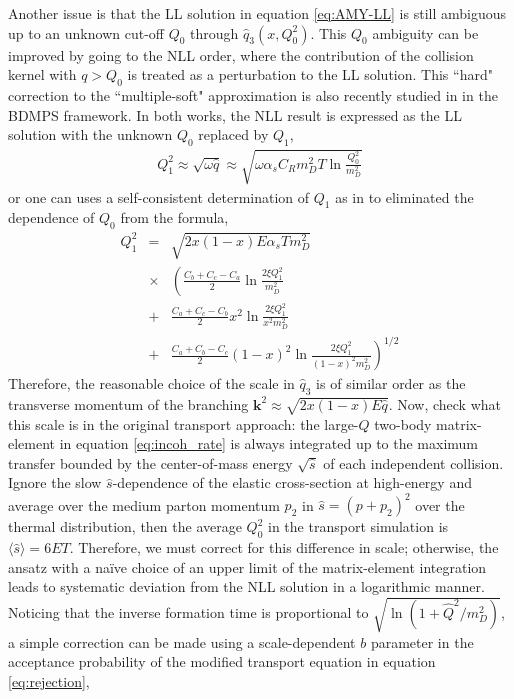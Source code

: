 \documentclass[aps, prc, reprint, amsmath, groupedaddress, nofootinbib]{revtex4-1}
\begin{document}
Another issue is that the LL solution in equation \ref{eq:AMY-LL} is still ambiguous up to an unknown cut-off $Q_0$ through $\hat{q}_3(x, Q_0^2)$.
This $Q_0$ ambiguity can be improved by going to the NLL order, where the contribution of the collision kernel with $q>Q_0$ is treated as a perturbation to the LL solution.
This ``hard" correction to the ``multiple-soft" approximation is also recently studied in \cite{Mehtar-Tani:2019tvy} in the BDMPS framework.
In both works, the NLL result is expressed as the LL solution with the unknown $Q_0$ replaced by $Q_1$,
\begin{eqnarray}
Q_1^2  \approx \sqrt{\omega \hat{q}} \approx \sqrt{\omega \alpha_s C_R m_D^2 T \ln\frac{Q_0^2}{m_D^2}}
\label{eq:Q1}
\end{eqnarray}
or one can uses a self-consistent determination of $Q_1$ as in \cite{Arnold:2008zu} to eliminated the dependence of $Q_0$ from the formula,
\begin{eqnarray}
Q_1^2 &=& \sqrt{2 x (1-x) E \alpha_s T m_D^2}\\\nonumber
&\times & \left(
\frac{C_b+C_c-C_a}{2}\ln\frac{2\xi Q_1^2}{m_D^2} \right.\\\nonumber 
&+& \frac{C_a+C_c-C_b}{2} x^2 \ln\frac{2\xi Q_1^2}{x^2 m_D^2} \\\nonumber 
&+& \left.\frac{C_a+C_b-C_c}{2} (1-x)^2 \ln\frac{2\xi Q_1^2}{(1-x)^2 m_D^2} \right)^{1/2}
\label{eq:Q1-sf}
\end{eqnarray}
Therefore, the reasonable choice of the scale in $\hat{q}_3$ is of similar order as the transverse momentum of the branching $\mathbf{k}^2 \approx \sqrt{2x(1-x)E \hat{q}}$.
Now, check what this scale is in the original transport approach: the large-$Q$ two-body matrix-element in equation \ref{eq:incoh_rate} is always integrated up to the maximum transfer bounded by the center-of-mass energy $\sqrt{\hat{s}}$ of each independent collision. 
Ignore the slow $\hat{s}$-dependence of the elastic cross-section at high-energy and average over the medium parton momentum $p_2$ in $\hat{s} = (p+p_2)^2$ over the thermal distribution, then the average $Q_{0}^2$ in the transport simulation is  $\langle\hat{s}\rangle = 6ET$.
Therefore, we must correct for this difference in scale; otherwise, the ansatz with a na\"ive choice of an upper limit of the matrix-element integration leads to systematic deviation from the NLL solution in a logarithmic manner.
Noticing that the inverse formation time is proportional to $\sqrt{\ln(1+\hat{Q}^2/m_D^2)}$, a simple correction can be made using a scale-dependent $b$ parameter in the acceptance probability of the modified transport equation in equation \ref{eq:rejection},
\end{document}
